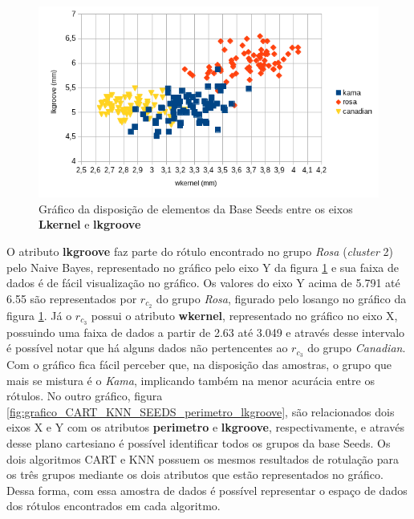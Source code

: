 \begin{figure}[h!]
        \centering
        \includegraphics[scale=0.9]{figs/grafico_NB_cluster1_2_wkernel_lkgroove_seeds.png}
        \caption{Gráfico da disposição de elementos da Base Seeds entre os eixos \textbf{Lkernel} e \textbf{lkgroove}} \label{fig:grafico_NB_cluster1_2_wkernel_lkgroove_seeds}
\end{figure}
 

O atributo \textbf{lkgroove} faz parte do rótulo encontrado no grupo \textit{Rosa} (\textit{cluster} 2) pelo Naive Bayes, representado no gráfico pelo eixo Y da figura \ref{fig:grafico_NB_cluster1_2_wkernel_lkgroove_seeds}   e sua faixa de dados é de fácil visualização no gráfico. Os valores do eixo Y acima de 5.791 até 6.55 são representados por  ${r_{c_2}}$ do grupo \textit{Rosa}, figurado pelo losango no gráfico da figura \ref{fig:grafico_NB_cluster1_2_wkernel_lkgroove_seeds}. Já o ${r_{c_3}}$ possui o atributo \textbf{wkernel}, representado no gráfico no eixo X, possuindo uma faixa de dados a partir de 2.63 até 3.049 e através desse intervalo é possível notar que há alguns dados não pertencentes ao ${r_{c_3}}$ do grupo \textit{Canadian}. Com o gráfico fica fácil perceber que, na disposição das amostras, o grupo que mais se mistura é o \textit{Kama}, implicando também na menor acurácia entre os rótulos. No outro gráfico, figura \ref{fig:grafico_CART_KNN_SEEDS_perimetro_lkgroove}, são relacionados dois eixos X e Y com os atributos \textbf{perimetro} e \textbf{lkgroove}, respectivamente, e através desse plano cartesiano é possível identificar todos os grupos da base Seeds. Os dois algoritmos CART e KNN possuem os mesmos resultados de rotulação para os três grupos mediante os dois atributos que estão representados no gráfico. Dessa forma, com essa amostra de dados é possível representar o espaço de dados dos rótulos encontrados em cada algoritmo. 

